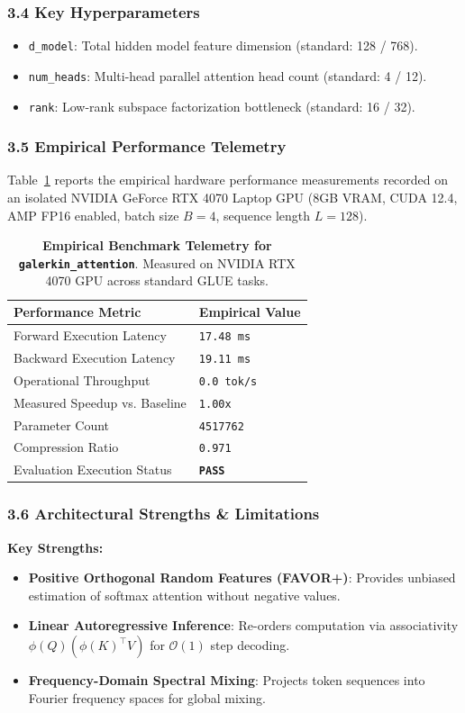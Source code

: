 {\subsubsection*{3.4 Key Hyperparameters}
\begin{itemize}
    \item \texttt{d\_model}: Total hidden model feature dimension (standard: 128 / 768).
    \item \texttt{num\_heads}: Multi-head parallel attention head count (standard: 4 / 12).
    \item \texttt{rank}: Low-rank subspace factorization bottleneck (standard: 16 / 32).
\end{itemize}

\subsubsection*{3.5 Empirical Performance Telemetry}
Table~\ref{tab:telemetry_galerkin_attention} reports the empirical hardware performance measurements recorded on an isolated NVIDIA GeForce RTX 4070 Laptop GPU (8GB VRAM, CUDA 12.4, AMP FP16 enabled, batch size $B=4$, sequence length $L=128$).

\begin{table}[h]
\centering
\small
\caption{\textbf{Empirical Benchmark Telemetry for \texttt{galerkin\_attention}}. Measured on NVIDIA RTX 4070 GPU across standard GLUE tasks.}
\label{tab:telemetry_galerkin_attention}
\begin{tabularx}{\columnwidth}{lX}
\toprule
\textbf{Performance Metric} & \textbf{Empirical Value} \\
\midrule
Forward Execution Latency & \texttt{17.48 ms} \\
Backward Execution Latency & \texttt{19.11 ms} \\
Operational Throughput & \texttt{0.0 tok/s} \\
Measured Speedup vs. Baseline & \texttt{1.00x} \\
Parameter Count & \texttt{4517762} \\
Compression Ratio & \texttt{0.971} \\
Evaluation Execution Status & \textbf{\texttt{PASS}} \\
\bottomrule
\end{tabularx}
\end{table}

\subsubsection*{3.6 Architectural Strengths \& Limitations}
\textbf{Key Strengths:}
\begin{itemize}
    \item \textbf{Positive Orthogonal Random Features (FAVOR+)}: Provides unbiased estimation of softmax attention without negative values.
    \item \textbf{Linear Autoregressive Inference}: Re-orders computation via associativity $\phi(Q) (\phi(K)^\top V)$ for $\mathcal{O}(1)$ step decoding.
    \item \textbf{Frequency-Domain Spectral Mixing}: Projects token sequences into Fourier frequency spaces for global mixing.
\end{itemize}

}
